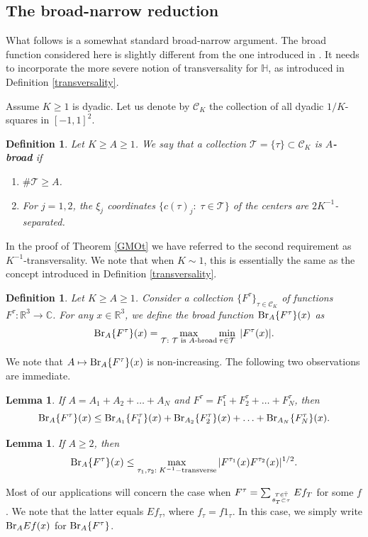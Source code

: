 \documentclass{amsart}%
\numberwithin{equation}{section}
\newtheorem{lemma}[theorem]{Lemma}
\newtheorem{definition}[theorem]{Definition}
\newcommand{\C}{\mathbb{C}}
\newcommand{\ZR}{\mathbb{R}}
\newcommand{\ZT}{\mathbb{T}}
\newcommand{\ZH}{\mathbb{H}}
\newcommand{\Tau}{\mathcal{T}}
\newcommand{\cT}{{\mathcal T}}
\newcommand{\cC}{{\mathcal C}}
\newcommand{\R}{\mathbb{R}}
\newcommand{\Br}{{\rm{Br}}}
\newcommand{\1}{\mathbbm{1}}
\begin{document}
\medskip 

\subsection{The broad-narrow reduction}


What follows is a somewhat standard broad-narrow argument. 
The broad function considered here is slightly different from the one introduced in \cite{Guth-R3}. It needs to incorporate the more severe notion of transversality for $\ZH$, as introduced in 
Definition \ref{transversality}.

Assume $K\ge 1$ is dyadic. Let us denote by $\cC_K$ the collection of all dyadic $1/K$-squares in $[-1,1]^2$.
\begin{definition}
	\label{def-broad}
	Let $K\geq A\geq1$.
	We say that a collection $\Tau=\{\tau\}\subset \cC_K$   is {\bf $A$-broad} if
	\begin{enumerate}
		\item $\#\Tau\geq A$.
		\item For $j=1,2$, the $\xi_j$ coordinates $\{c(\tau)_j:\;\tau\in\Tau\}$ of the centers  are $2K^{-1}$-separated.
	\end{enumerate}
\end{definition}
In the proof of Theorem \ref{GMOt} we have referred to the second requirement as $K^{-1}$-transversality.
We note that when $K\sim 1$, this is essentially the same as the concept introduced in  Definition \ref{transversality}.

\begin{definition}
	\label{broad-norm}
	Let $K\geq A\geq1$. Consider a collection $\{F^\tau\}_{\tau\in\cC_K}$ of functions $F^\tau:\R^3\to\C$.
	For any $x\in\ZR^3$, we define the broad function $\Br_A \{F^\tau\}(x)$ as
	\begin{equation}
		\nonumber
		\Br_A \{F^\tau\}(x)=\max_{\cT:\text{ $\cT$ is $A$-broad}}\min_{\tau\in\cT}\;|F^\tau(x)|.
	\end{equation}
\end{definition}
We note that $A\mapsto \Br_A \{F^\tau\}(x)$ is non-increasing. The following two observations are immediate.
\begin{lemma}
	If $A=A_1+A_2+\ldots+A_N$ and $F^{\tau}=F^{\tau}_1+F^{\tau}_2+\ldots+F^{\tau}_N$, then
	\begin{equation}
		\label{broad-triangle}
		\Br_A \{F^\tau\}(x)\leq \Br_{A_1} \{F^{\tau}_1\}(x)+\Br_{A_2}\{F^{\tau}_2\}(x)+\ldots+\Br_{A_N}\{F^{\tau}_N\}(x).
	\end{equation}
\end{lemma}
\begin{lemma}
	If $A\geq 2$, then
	\begin{equation}
		\label{broad-bilinear}
		\Br_A \{F^{\tau}\}(x)\leq \max_{\tau_1,\tau_2:\;K^{-1}-\text{transverse}}|F^{\tau_1}(x)F^{\tau_2}(x)|^{1/2}.
	\end{equation}
\end{lemma}
Most of our applications will concern the case when $F^{\tau}=\sum_{T\in\bar{\ZT}\atop{\theta_T\subset\tau}}Ef_T$ for some $f$. We note that the latter equals $Ef_\tau$, where $f_\tau=f1_{\tau}$. In this case, we simply write $\Br_AEf(x)$ for $\Br_A \{F^{\tau}\}$.
\end{document}
